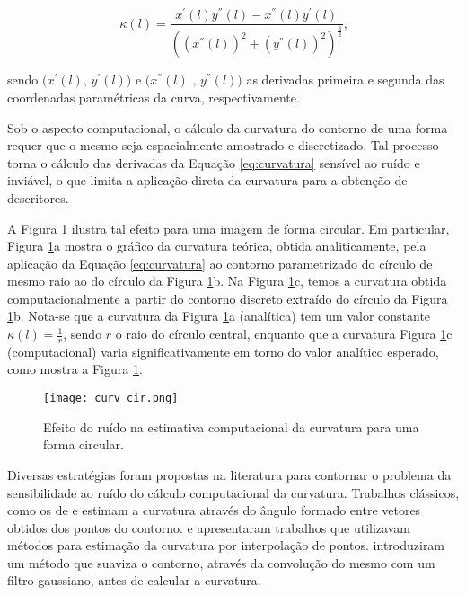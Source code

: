 \begin{equation} \label{eq:curvatura}
\kappa(l) = \frac{x^{'}(l)y^{''}(l)-x^{''}(l)y^{'}(l)}{((x^{''}(l))^{2}+(y^{''}(l))^{2})^{\frac{3}{2}}}\text{,}
\end{equation}

\noindent 
sendo $\big(x^{'}(l) \text{, }y^{'}(l)\big)$ e $\big(x^{''}(l)\text{ , }y^{''}(l)\big)$ as derivadas primeira e segunda das coordenadas paramétricas da curva, respectivamente.

Sob o aspecto computacional, o cálculo da curvatura do contorno de uma forma requer que o mesmo seja espacialmente amostrado e discretizado. Tal processo torna o cálculo das derivadas da Equação \ref{eq:curvatura} sensível ao ruído e inviável, o que limita a aplicação direta da curvatura para a obtenção de descritores. 

A Figura \ref{fig:cir1} ilustra tal efeito para uma imagem de forma circular. Em particular, Figura \ref{fig:cir1}a mostra o gráfico da curvatura teórica, obtida analiticamente, pela aplicação da Equação \ref{eq:curvatura} ao contorno parametrizado do círculo de mesmo raio ao do círculo da Figura \ref{fig:cir1}b. Na Figura \ref{fig:cir1}c, temos a curvatura obtida computacionalmente a partir do contorno discreto extraído do círculo da Figura \ref{fig:cir1}b. Nota-se que a curvatura da Figura \ref{fig:cir1}a (analítica) tem um valor constante $\kappa(l) = \frac{1}{r}$, sendo $r$ o raio do círculo central, enquanto que a curvatura Figura \ref{fig:cir1}c (computacional) varia significativamente em torno do valor analítico esperado, como mostra a Figura \ref{fig:cir1}. 

\begin{figure}[h!]
  \caption{\label{fig:cir1} Efeito do ruído na estimativa computacional da curvatura para uma forma circular.}
  \centering
  \texttt{[image: curv\_cir.png]}
\end{figure}

Diversas estratégias foram propostas na literatura para contornar o problema da sensibilidade ao ruído do cálculo computacional da curvatura. Trabalhos clássicos, como os de  e  estimam a curvatura através do ângulo formado entre vetores obtidos dos pontos do contorno.  e  apresentaram trabalhos que utilizavam métodos para estimação da curvatura por interpolação de pontos.  introduziram um método que suaviza o contorno, através da convolução do mesmo com um filtro gaussiano, antes de calcular a curvatura.

